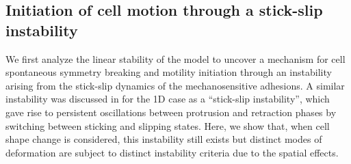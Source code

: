 \documentclass[12pt]{article}
\begin{document}
        \subsection*{Initiation of cell motion through a stick-slip instability}
        We first analyze the linear stability of the model to uncover a mechanism for cell spontaneous symmetry breaking and motility initiation through an instability arising from the stick-slip dynamics of the mechanosensitive adhesions. 
        A similar instability was discussed in \cite{sens2020stick} for the 1D case as a ``stick-slip instability'', which gave rise to persistent oscillations between protrusion and retraction phases by switching between sticking and slipping states. 
        Here, we show that, when cell shape change is considered, this instability still exists but distinct modes of deformation are subject to distinct instability criteria due to the spatial effects. 
\end{document}

